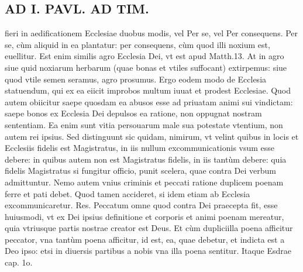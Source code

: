 \documentclass{article}
\begin{document}
\begin{pages}
\section*{AD I. PAVL. AD TIM. }
\marginpar{[ p.90 ]}\pstart fieri in aedificationem Ecclesiae duobus modis, vel Per se, vel Per consequens. Per se, cùm aliquid in ea plantatur: per consequens, cùm quod illi noxium est, euellitur. Est enim similis agro Ecclesia Dei, vt est apud Matth.13. At in agro siue quid noxiarum herbarum (quae bonas et vtiles suffocant) extirpemus: siue quod vtile semen seramus, agro prosumus. Ergo eodem modo de Ecclesia statuendum, qui ex ea eiicit improbos multum iuuat et prodest Ecclesiae.  \pend\pstart Quod autem obiicitur saepe quosdam ea abusos esse ad priuatam animi sui vindictam: saepe bonos ex Ecclesia Dei depulsos ea ratione, non oppugnat nostram sententiam. Ea enim sunt vitia persouarum male sua potestate vtentium, non autem rei ipsius. Sed distinguunt sic quidam, nimirum, vt velint quibus in locis et Ecclesiis fidelis est Magistratus, in iis nullum excommunicationis vsum esse debere: in quibus autem non est Magistratus fidelis, in iis tantùm debere: quia fidelis Magistratus si fungitur officio, punit scelera, quae contra Dei verbum admittuntur. Nemo autem vnius criminis et peccati ratione duplicem poenam ferre et pati debet. Quod tamen accideret, si idem etiam ab Ecclesia excommunicaretur. Res. Peccatum omne quod contra Dei praecepta fit, esse huiusmodi, vt ex Dei ipsius definitione et corporis et animi poenam mereatur, quia vtriusque partis nostrae creator est Deus. Et cùm dupliciilla poena afficitur peccator, vna tantùm poena afficitur, id est, ea, quae debetur, et indicta est a Deo ipso: etsi in diuersis partibus a nobis vna illa poena sentitur. Itaque Esdrae cap. 1o.  \pend

\end{pages}
\end{document}
